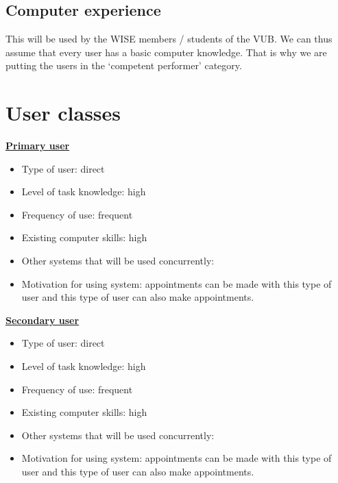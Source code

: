 \documentclass[11pt, a4paper,svglistings]{report}
\begin{document}
\subsection{Computer experience}

This will be used by the WISE members / students of the VUB. We can thus assume that every user has a basic computer knowledge. That is why we are putting the users in the `competent performer' category.


\section{User classes}

\textbf{\underline{Primary user}}
\begin{itemize}
\item Type of user: direct
\item Level of task knowledge: high
\item Frequency of use: frequent  
\item Existing computer skills: high 
\item Other systems that will be used concurrently:
\item Motivation for using system: appointments can be made with this type of user and this type of user can also make appointments.
\end{itemize}
\textbf{\underline{Secondary user}}
\begin{itemize}
\item Type of user: direct
\item  Level of task knowledge: high
\item Frequency of use: frequent
\item Existing computer skills: high 
\item Other systems that will be used concurrently:
\item Motivation for using system: appointments can be made with this type of user and this type of user can also make appointments. 
\end{itemize}



\end{document}
